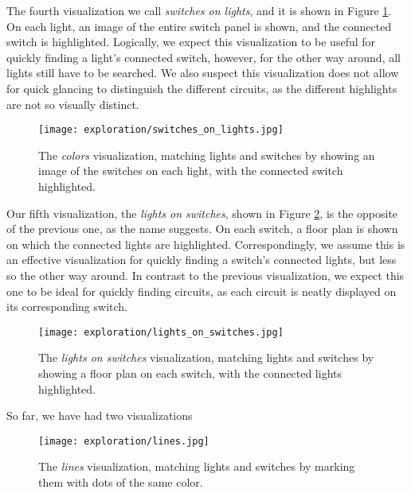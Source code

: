 The fourth visualization we call \textit{switches on lights}, and it is shown in Figure \ref{fig:explor:switches_on_lights_vis}. On each light, an image of the entire switch panel is shown, and the connected switch is highlighted. Logically, we expect this visualization to be useful for quickly finding a light's connected switch, however, for the other way around, all lights still have to be searched. We also suspect this visualization does not allow for quick glancing to distinguish the different circuits, as the different highlights are not so visually distinct.

\begin{figure}
    \centering
    \texttt{[image: exploration/switches\_on\_lights.jpg]}
    \caption{The \textit{colors} visualization, matching lights and switches by showing an image of the switches on each light, with the connected switch highlighted.}
    \label{fig:explor:switches_on_lights_vis}
\end{figure}

Our fifth visualization, the \textit{lights on switches}, shown in Figure \ref{fig:explor:lights_on_switches_vis}, is the opposite of the previous one, as the name suggests. On each switch, a floor plan is shown on which the connected lights are highlighted. Correspondingly, we assume this is an effective visualization for quickly finding a switch's connected lights, but less so the other way around. In contrast to the previous visualization, we expect this one to be ideal for quickly finding circuits, as each circuit is neatly displayed on its corresponding switch.

\begin{figure}
    \centering
    \texttt{[image: exploration/lights\_on\_switches.jpg]}
    \caption{The \textit{lights on switches} visualization, matching lights and switches by showing a floor plan on each switch, with the connected lights highlighted.}
    \label{fig:explor:lights_on_switches_vis}
\end{figure}

So far, we have had two visualizations 

\begin{figure}
    \centering
    \texttt{[image: exploration/lines.jpg]}
    \caption{The \textit{lines} visualization, matching lights and switches by marking them with dots of the same color.}
    \label{fig:explor:lines_vis}
\end{figure}

